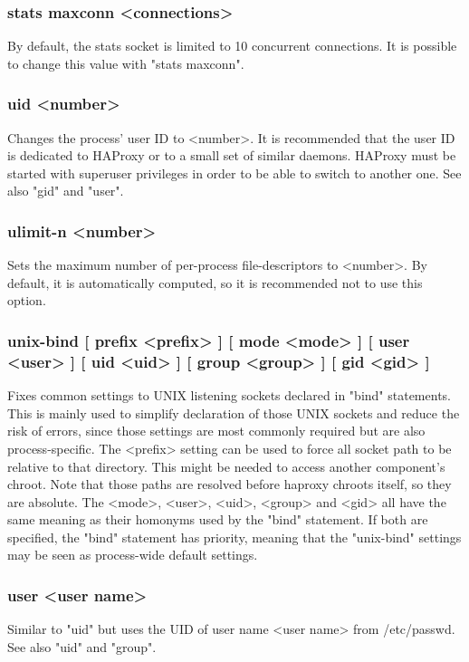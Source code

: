 \subsubsection[stats maxconn]{stats maxconn <connections>}
  By default, the stats socket is limited to 10 concurrent connections. It is
  possible to change this value with "stats maxconn".

\subsubsection[uid]{uid <number>}
  Changes the process' user ID to <number>. It is recommended that the user ID
  is dedicated to HAProxy or to a small set of similar daemons. HAProxy must
  be started with superuser privileges in order to be able to switch to another
  one. See also "gid" and "user".

\subsubsection[ulimit-n]{ulimit-n <number>}
  Sets the maximum number of per-process file-descriptors to <number>. By
  default, it is automatically computed, so it is recommended not to use this
  option.

\subsubsection[unix-bind]{unix-bind [ prefix <prefix> ] [ mode <mode> ] [ user <user> ] [ uid <uid> ] [ group <group> ] [ gid <gid> ]}
  Fixes common settings to UNIX listening sockets declared in "bind" statements.
  This is mainly used to simplify declaration of those UNIX sockets and reduce
  the risk of errors, since those settings are most commonly required but are
  also process-specific. The <prefix> setting can be used to force all socket
  path to be relative to that directory. This might be needed to access another
  component's chroot. Note that those paths are resolved before haproxy chroots
  itself, so they are absolute. The <mode>, <user>, <uid>, <group> and <gid>
  all have the same meaning as their homonyms used by the "bind" statement. If
  both are specified, the "bind" statement has priority, meaning that the
  "unix-bind" settings may be seen as process-wide default settings.

\subsubsection[user]{user <user name>}
  Similar to "uid" but uses the UID of user name <user name> from /etc/passwd.
  See also "uid" and "group".

